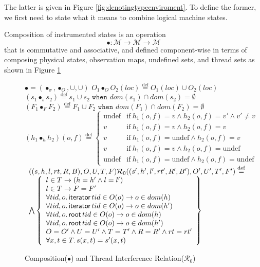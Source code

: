 The latter is given in Figure \ref{fig:denotingtypeenviroment}.  To define the former, we first need to state what it means to combine logical machine states.

Composition of instrumented states is an operation
\[\bullet : \mathcal{M} \longrightarrow \mathcal{M} \longrightarrow \mathcal{M}\]
that is commutative and associative, and defined component-wise in terms of composing physical states, observation maps, undefined sets, and thread sets as shown in Figure \ref{fig:comp}
\begin{figure}\scriptsize
$  \bullet  = (\bullet_{\sigma},\bullet_O,\cup,\cup)$ \quad
  $O_{1} \bullet_O O_{2}(loc) \overset{\mathrm{def}}{=}  O_{1}(loc) \cup O_{2}(loc)$\quad
  $ (s_1 \bullet_s s_2) \overset{\mathrm{def}}{=}  s_1 \cup s_2 \texttt{   when   } dom(s_1) \cap dom(s_2) = \emptyset$ \\
  $(F_1 \bullet_F F_2) \overset{\mathrm{def}}{=}  F_1  \cup F_2 \texttt{   when   } dom(F_1) \cap dom(F_2) = \emptyset$ \\
$(h_1\bullet_h h_2)(o,f)\overset{\mathrm{def}}{=}\left\{
\begin{array}{ll}
\mathrm{undef} & \textrm{if}~h_1(o,f)=v \land h_2(o,f)=v' \land v' \neq v\\
v & \textrm{if}~h_1(o,f)=v \land h_2(o,f)=v\\
v & \textrm{if}~h_1(o,f)=\mathrm{undef}\land h_2(o,f)=v\\
v & \textrm{if}~h_1(o,f)=v\land h_2(o,f)=\mathrm{undef}\\
\mathrm{undef} & \textrm{if}~h_1(o,f)=\mathrm{undef}\land h_2(o,f)=\mathrm{undef}
\end{array}
\right.
$
$
\begin{array}{l}
((s,h,l,rt,R,B), O, U, T,F) \mathcal{R}_{0}((s',h',l',rt',R',B'), O', U', T',F') \overset{\mathrm{def}}{=}
\\ \bigwedge\left\{
	\begin{array}{l}
	  l  \in  T \rightarrow (h = h' \land l=l')\\
	  l\in T\rightarrow F=F'\\
	  \forall tid,o\ldotp\textsf{iterator} \, tid \in O(o) \rightarrow o \in dom(h) \\
	  \forall tid,o\ldotp\textsf{iterator} \, tid \in O(o) \rightarrow o \in dom(h') \\
          \forall tid,o\ldotp\textsf{root} \, tid \in O(o) \rightarrow o \in dom(h) \\
	  \forall tid,o\ldotp\textsf{root} \, tid \in O(o) \rightarrow o \in dom(h') \\
	  O = O' \land U = U' \land T = T'\land R =R'\land rt = rt' \\
	  \forall x, t \in T \ldotp s(x,t) = s'(x,t)
	\end{array}
\right\}
\end{array}
$
\caption{Composition($\bullet$) and Thread Interference Relation($\mathcal{R}_{0}$)}
\label{fig:comp}
\vspace{-2mm}
\end{figure}
